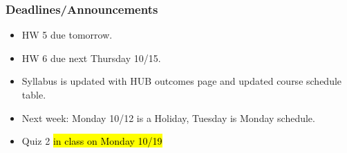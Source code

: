 
\begin{frame}
    \frametitle{Deadlines/Announcements}
\begin{itemize}
            \item HW 5 due tomorrow.
            \item HW 6 due next Thursday 10/15.
            \item Syllabus is updated with HUB outcomes page and updated course schedule table. 
            \item Next week: Monday 10/12 is a Holiday, Tuesday is Monday schedule.
            \item Quiz 2 \hl{in class on Monday 10/19} %
        \end{itemize}
\end{frame}
